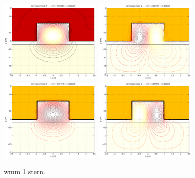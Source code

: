 \begin{figure}[htbp]
  \begin{center}
    \includegraphics[width=5cm]{pics/wmm01_stern_TE1}
    \includegraphics[width=5cm]{pics/wmm01_stern_TE2}
    \includegraphics[width=5cm]{pics/wmm01_stern_TM1}
    \includegraphics[width=5cm]{pics/wmm01_stern_TM2}
  \end{center}
  \caption{wmm 1 stern.}
  \label{fig:wmm1_stern}
\end{figure}  

